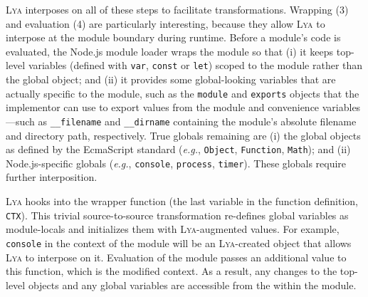 \documentclass[letterpaper,twocolumn,10pt]{article}
\def\eg{{\em e.g.}, }
\def\etc{{\em etc.}\xspace}
\newcommand{\ttt}[1]{\texttt{#1}}
\newcommand{\sys}{{\scshape Lya}\xspace}
\begin{document}
\sys interposes on all of these steps to facilitate transformations.
Wrapping (3) and evaluation (4) are particularly interesting, because they allow \sys to interpose at the module boundary during runtime.
Before a module's code is evaluated, the Node.js module loader wraps the module so that
  (i) it keeps top-level variables (defined with \ttt{var}, \ttt{const} or \ttt{let}) scoped to the module rather than the global object; and
  (ii) it provides some global-looking variables that are actually specific to the module, such as the \ttt{module} and \ttt{exports} objects that the implementor can use to export values from the module and convenience variables---such as \ttt{\_\_filename} and \ttt{\_\_dirname}  containing the module's absolute filename and directory path, respectively.
True globals remaining are
  (i) the global objects as defined by the EcmaScript standard (\eg \ttt{Object}, \ttt{Function}, \ttt{Math}); and
  (ii) Node.js-specific globals (\eg \ttt{console}, \ttt{process}, \ttt{timer}).
These globals require further interposition.



\sys hooks into the wrapper function (the last variable in the function definition, \ttt{CTX}).
This trivial source-to-source transformation re-defines global variables as module-locals and initializes them with \sys-augmented values.
For example, \ttt{console} in the context of the module will be an \sys-created object that allows \sys to interpose on it.
Evaluation of the module passes an additional value to this function, which is the modified context.
As a result, any changes to the top-level objects and any global variables are accessible from the within the module.
\end{document}
